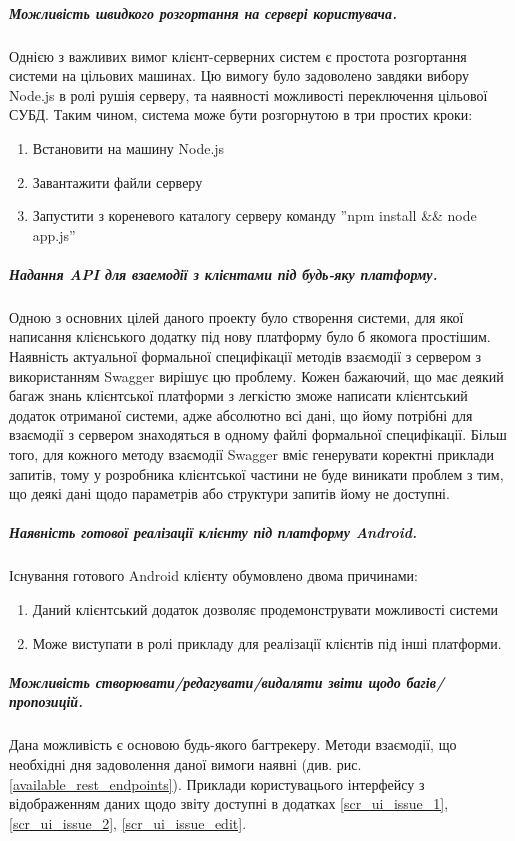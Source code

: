 \documentclass[../main.tex]{subfiles}
\begin{document}
\subparagraph{Можливість швидкого розгортання на сервері користувача.}
Однією з важливих вимог клієнт-серверних систем є простота розгортання системи на цільових машинах. Цю вимогу було задоволено завдяки вибору Node.js в ролі рушія серверу, та наявності можливості переключення цільової СУБД. Таким чином, система може бути розгорнутою в три простих кроки:
\begin{enumerate}
	\item Встановити на машину Node.js
	\item Завантажити файли серверу
	\item Запустити з кореневого каталогу серверу команду ''npm install \&\& node app.js''
\end{enumerate}

\subparagraph{Надання API для взаемодії з клієнтами під будь-яку платформу.}
Одною з основних цілей даного проекту було створення системи, для якої написання клієнського додатку під нову платформу було б якомога простішим. Наявність актуальної формальної специфікації методів взаємодії з сервером з використанням Swagger вирішує цю проблему. Кожен бажаючий, що має деякий багаж знань клієнтської платформи з легкістю зможе написати клієнтський додаток отриманої системи, адже абсолютно всі дані, що йому потрібні для взаємодії з сервером знаходяться в одному файлі формальної специфікації. Більш того, для кожного методу взаємодії Swagger вміє генерувати коректні приклади запитів, тому у розробника клієнтської частини не буде виникати проблем з тим, що деякі дані щодо параметрів або структури запитів йому не доступні.

\subparagraph{Наявність готової реалізації клієнту під платформу Android.}
Існування готового Android клієнту обумовлено двома причинами:
\begin{enumerate}
	\item Даний клієнтський додаток дозволяє продемонструвати можливості системи
	\item Може виступати в ролі прикладу для реалізації клієнтів під інші платформи.
\end{enumerate}

\subparagraph{Можливість створювати/редагувати/видаляти звіти щодо багів/пропозицій.}
Дана можливість є основою будь-якого багтрекеру. Методи взаємодії, що необхідні дня задоволення даної вимоги наявні (див. рис. \ref{available_rest_endpoints}). Приклади користувацього інтерфейсу з відображенням даних щодо звіту доступні в додатках \ref{scr_ui_issue_1}, \ref{scr_ui_issue_2}, \ref{scr_ui_issue_edit}.
\end{document}
